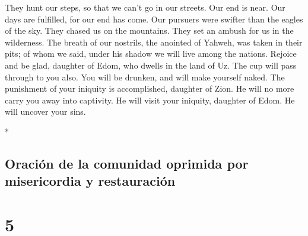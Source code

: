 \begin{paracol}{2}
\begin{otherlanguage}{english}
 They hunt our steps, so that we can't go in our streets.
Our end is near. Our days are fulfilled, for our end has come.
 Our pursuers were swifter than the eagles of the sky.
They chased us on the mountains. They set an ambush for us in the
wilderness.  The breath of our nostrils, the anointed of
Yahweh, was taken in their pits; of whom we said, under his shadow we
will live among the nations.  Rejoice and be glad,
daughter of Edom, who dwells in the land of Uz. The cup will pass
through to you also. You will be drunken, and will make yourself naked.
 The punishment of your iniquity is accomplished,
daughter of Zion. He will no more carry you away into captivity. He will
visit your iniquity, daughter of Edom. He will uncover your sins.

\end{otherlanguage}

\switchcolumn[0]*

\hypertarget{oraciuxf3n-de-la-comunidad-oprimida-por-misericordia-y-restauraciuxf3n}{%
\subsection{Oración de la comunidad oprimida por misericordia y
restauración}\label{oraciuxf3n-de-la-comunidad-oprimida-por-misericordia-y-restauraciuxf3n}}

\hypertarget{section-8}{%
\section{5}\label{section-8}}


\end{paracol}
